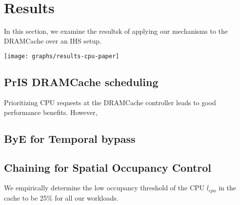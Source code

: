 \section{Results} \label{results}
In this section, we examine the resultsk of applying our mechanisms to the DRAMCache over an IHS setup.
\begin{figure*}[!htb]
    \centering
    \texttt{[image: graphs/results-cpu-paper]}
    \label{fig:chain-access}
\end{figure*}
\subsection{PrIS DRAMCache scheduling}
Prioritizing CPU requests at the DRAMCache controller leads to good performance benefits. However, 
\subsection{ByE for Temporal bypass}

\subsection{Chaining for Spatial Occupancy Control}
We empirically determine the low occupancy threshold of the CPU \textit{$l_{cpu}$} in the cache to be 25\% for all our workloads.
